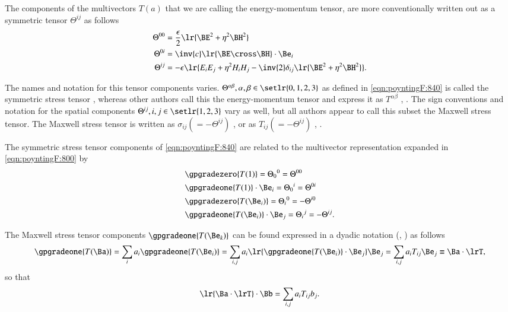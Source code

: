 The components of the multivectors \( T(a) \) that we are calling the energy-momentum tensor, are more conventionally written out
as a symmetric tensor \( \Theta^{ij} \) as follows
\begin{dmath}\label{eqn:poyntingF:840}
\begin{aligned}
\Theta^{00} &= \frac{\epsilon}{2} \lr{ \BE^2 + \eta^2 \BH^2 } \\
\Theta^{0i} &= \inv{c} \lr{ \BE \cross \BH } \cdot \Be_i \\
\Theta^{ij} &= -\epsilon \lr{ E_i E_j + \eta^2 H_i H_j - \inv{2} \delta_{ij} \lr{ \BE^2 + \eta^2 \BH^2 } }.
\end{aligned}
\end{dmath}

The names and notation for this tensor components varies.
\( \Theta^{\alpha\beta}, \alpha, \beta \in \setlr{0,1,2,3} \) as defined in \cref{eqn:poyntingF:840} is called the symmetric
stress tensor \citep{jackson1975cew},
whereas other authors call this the energy-momentum tensor and express it as \( T^{\alpha\beta} \) \citep{landau1980classical}, \citep{doran2003gap}.
The sign conventions and notation for the spatial components \( \Theta^{ij}, i, j \in \setlr{1,2,3} \) vary as well, but all authors appear to call this subset the Maxwell stress tensor.
The Maxwell stress tensor is written as \( \sigma_{ij} (=-\Theta^{ij}) \) \citep{landau1980classical}, or as
\( T_{ij} (=-\Theta^{ij}) \)
\citep{griffiths1999introduction},
\citep{jackson1975cew}.

The symmetric stress tensor components of \cref{eqn:poyntingF:840}
are related to the multivector representation expanded in \cref{eqn:poyntingF:800} by
\begin{dmath}\label{eqn:poyntingF:820}
\begin{aligned}
&\gpgradezero{ T(1) }
=
{\Theta_0}^0 = \Theta^{00} \\
&\gpgradeone{ T(1) } \cdot \Be_i
= {\Theta_0}^i = \Theta^{0i} \\
&\gpgradezero{ T(\Be_i) }
= {\Theta_i}^0 = -\Theta^{i0} \\
&\gpgradeone{ T(\Be_i) } \cdot \Be_j = {\Theta_i}^j = -\Theta^{ij}.
\end{aligned}
\end{dmath}

The Maxwell stress tensor components \( \gpgradeone{T(\Be_k)} \) can be found expressed in a dyadic notation (\citep{griffiths1999introduction}, \citep{jackson1975cew}) as follows
\begin{dmath}\label{eqn:poyntingF:1140}
\gpgradeone{ T(\Ba) }
=
\sum_i a_i \gpgradeone{ T(\Be_i) }
=
\sum_{i,j} a_i \lr{ \gpgradeone{ T(\Be_i) } \cdot \Be_j } \Be_j
=
\sum_{i,j} a_i T_{ij} \Be_j
\equiv
\Ba \cdot \lrT,
\end{dmath}
so that
\begin{dmath}\label{eqn:poyntingF:1160}
\lr{ \Ba \cdot \lrT } \cdot \Bb
=
\sum_{i,j} a_i T_{ij} b_j.
\end{dmath}

